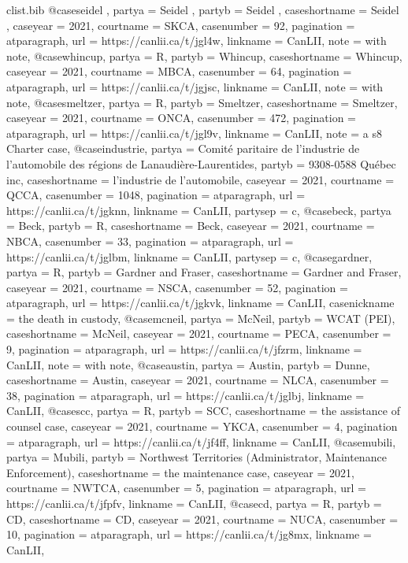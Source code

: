 \begin{filecontents*}[overwrite]{clist\jobname.bib}
@case{seidel ,	partya =  {Seidel },	partyb =  {Seidel },	caseshortname =  {Seidel },	caseyear =  {2021},	courtname =  {SKCA},	casenumber =  {92},	pagination =  {atparagraph},						url =  {https://canlii.ca/t/jgl4w},	linkname =  {CanLII},							note =  {with note},				}
@case{whincup,	partya =  {R},	partyb =  {Whincup},	caseshortname =  {Whincup},	caseyear =  {2021},	courtname =  {MBCA},	casenumber =  {64},	pagination =  {atparagraph},						url =  {https://canlii.ca/t/jgjsc},	linkname =  {CanLII},							note =  {with note},				}
@case{smeltzer,	partya =  {R},	partyb =  {Smeltzer},	caseshortname =  {Smeltzer},	caseyear =  {2021},	courtname =  {ONCA},	casenumber =  {472},	pagination =  {atparagraph},						url =  {https://canlii.ca/t/jgl9v},	linkname =  {CanLII},							note =  {a s8 Charter case},			}
@case{industrie,	partya =  {Comité paritaire de l'industrie de l'automobile des régions de Lanaudière-Laurentides},	partyb =  {9308-0588 Québec inc},	caseshortname =  {l'industrie de l'automobile},	caseyear =  {2021},	courtname =  {QCCA},	casenumber =  {1048},	pagination =  {atparagraph},						url =  {https://canlii.ca/t/jgknn},	linkname =  {CanLII},								partysep =  {c},		}
@case{beck,	partya =  {Beck},	partyb =  {R},	caseshortname =  {Beck},	caseyear =  {2021},	courtname =  {NBCA},	casenumber =  {33},	pagination =  {atparagraph},						url =  {https://canlii.ca/t/jglbm},	linkname =  {CanLII},								partysep =  {c},		}
@case{gardner,	partya =  {R},	partyb =  {Gardner and Fraser},	caseshortname =  {Gardner and Fraser},	caseyear =  {2021},	courtname =  {NSCA},	casenumber =  {52},	pagination =  {atparagraph},						url =  {https://canlii.ca/t/jgkvk},	linkname =  {CanLII},									casenickname =  {the death in custody},		}
@case{mcneil,	partya =  {McNeil},	partyb =  {WCAT (PEI)},	caseshortname =  {McNeil},	caseyear =  {2021},	courtname =  {PECA},	casenumber =  {9},	pagination =  {atparagraph},						url =  {https://canlii.ca/t/jfzrm},	linkname =  {CanLII},							note =  {with note},				}
@case{austin,	partya =  {Austin},	partyb =  {Dunne},	caseshortname =  {Austin},	caseyear =  {2021},	courtname =  {NLCA},	casenumber =  {38},	pagination =  {atparagraph},						url =  {https://canlii.ca/t/jglbj},	linkname =  {CanLII},										}
@case{scc,	partya =  {R},	partyb =  {SCC},	caseshortname =  {the assistance of counsel case},	caseyear =  {2021},	courtname =  {YKCA},	casenumber =  {4},	pagination =  {atparagraph},						url =  {https://canlii.ca/t/jf4ff},	linkname =  {CanLII},											}
@case{mubili,	partya =  {Mubili},	partyb =  {Northwest Territories (Administrator, Maintenance Enforcement)},	caseshortname =  {the maintenance case},	caseyear =  {2021},	courtname =  {NWTCA},	casenumber =  {5},	pagination =  {atparagraph},						url =  {https://canlii.ca/t/jfpfv},	linkname =  {CanLII},											}
@case{cd,	partya =  {R},	partyb =  {CD},	caseshortname =  {CD},	caseyear =  {2021},	courtname =  {NUCA},	casenumber =  {10},	pagination =  {atparagraph},						url =  {https://canlii.ca/t/jg8mx},	linkname =  {CanLII},										}




\end{filecontents*}
